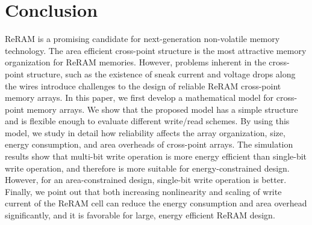 
\section{Conclusion}\label{sec:conclusion}
\vspace{10pt}
ReRAM is a promising candidate for next-generation
non-volatile memory technology. The area efficient cross-point structure
is the most attractive memory organization for ReRAM memories. However,
problems inherent in the cross-point structure, such as the existence of
sneak current and voltage drops along the wires introduce challenges to
the design of reliable ReRAM cross-point memory arrays. In this paper, we
first develop a mathematical model for cross-point memory arrays. We show
that the proposed model has a simple structure and is flexible enough to
evaluate different write/read schemes. By using this model, we study in
detail how reliability affects the array organization, size, energy
consumption, and area overheads of cross-point arrays. The simulation
results show that multi-bit write operation is more energy efficient than
single-bit write operation, and therefore is more suitable for
energy-constrained design. However, for an area-constrained design,
single-bit write operation is better. Finally, we point out that both
increasing nonlinearity and scaling of write current of the ReRAM cell can
reduce the energy consumption and area overhead significantly, and it is
favorable for large, energy efficient ReRAM design.
